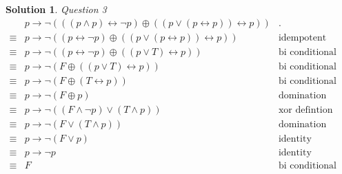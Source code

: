\documentclass{article}
\theoremstyle{definition}
\newtheorem*{solution}{Solution}
\begin{document}
\begin{solution}
 \textit{Question 3}
 \begin{align*}
 & p \to \neg (((p \wedge p) \leftrightarrow \neg p) \oplus ((p \vee (p \leftrightarrow p)) \leftrightarrow p)) & \text{.}\\
 \equiv & p \to \neg ((p \leftrightarrow \neg p) \oplus ((p \vee (p \leftrightarrow p)) \leftrightarrow p)) & \text{idempotent}\\
 \equiv & p \to \neg ((p \leftrightarrow \neg p) \oplus ((p \vee T) \leftrightarrow p)) & \text{bi conditional definition}\\
 \equiv & p \to \neg (F \oplus ((p \vee T) \leftrightarrow p)) & \text{bi conditional definition}\\
 \equiv & p \to \neg (F \oplus (T \leftrightarrow p)) & \text{bi conditional definition}\\
 \equiv & p \to \neg (F \oplus p) & \text{domination}\\
 \equiv & p \to \neg ((F \wedge \neg p) \vee (T \wedge p)) & \text{xor defintion}\\
 \equiv & p \to \neg (F \vee (T \wedge p)) & \text{domination}\\
 \equiv & p \to \neg (F \vee p) & \text{identity}\\
 \equiv & p \to \neg p & \text{identity}\\
 \equiv & F & \text{bi conditional definition}\\
 \end{align*}
 

\end{solution}
\end{document}
